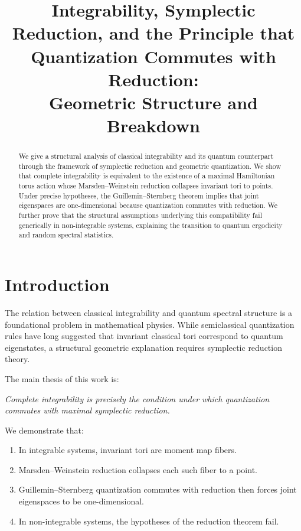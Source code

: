 \documentclass[11pt]{article}
\title{\textbf{Integrability, Symplectic Reduction, and the Principle that\\
Quantization Commutes with Reduction:\\
Geometric Structure and Breakdown}}
\author{}
\date{}
\begin{document}
\maketitle

\begin{abstract}
We give a structural analysis of classical integrability and its quantum counterpart through the framework of symplectic reduction and geometric quantization. 
We show that complete integrability is equivalent to the existence of a maximal Hamiltonian torus action whose Marsden--Weinstein reduction collapses invariant tori to points. 
Under precise hypotheses, the Guillemin--Sternberg theorem implies that joint eigenspaces are one-dimensional because quantization commutes with reduction. 
We further prove that the structural assumptions underlying this compatibility fail generically in non-integrable systems, explaining the transition to quantum ergodicity and random spectral statistics.
\end{abstract}

\tableofcontents

\section{Introduction}

The relation between classical integrability and quantum spectral structure
is a foundational problem in mathematical physics. 
While semiclassical quantization rules have long suggested that invariant classical tori correspond to quantum eigenstates, 
a structural geometric explanation requires symplectic reduction theory.

The main thesis of this work is:

\begin{center}
\emph{Complete integrability is precisely the condition under which quantization commutes with maximal symplectic reduction.}
\end{center}

We demonstrate that:

\begin{enumerate}
\item In integrable systems, invariant tori are moment map fibers.
\item Marsden--Weinstein reduction collapses each such fiber to a point.
\item Guillemin--Sternberg quantization commutes with reduction then forces joint eigenspaces to be one-dimensional.
\item In non-integrable systems, the hypotheses of the reduction theorem fail.
\end{enumerate}
\end{document}
